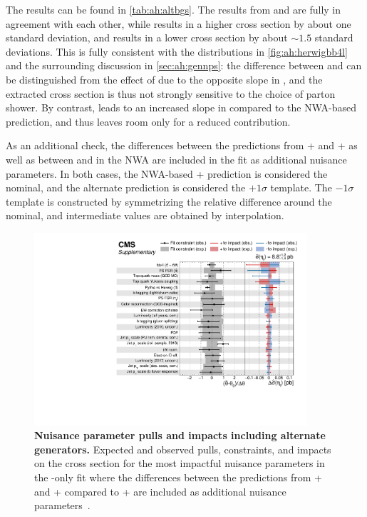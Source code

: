 The results can be found in \cref{tab:ah:altbgs}. The results from \pythia and \herwig are fully in agreement with each other, while \amcatnlo results in a higher \etat cross section by about one standard deviation, and \bbfourl results in a lower \etat cross section by about $\sim1.5$ standard deviations. 
This is fully consistent with the distributions in \cref{fig:ah:herwigbb4l} and the surrounding discussion in \cref{sec:ah:gennps}: the difference between \pythia and \herwig can be distinguished from the effect of \etat due to the opposite slope in \chel, and the extracted \etat cross section is thus not strongly sensitive to the choice of parton shower. By contrast, \bbfourl leads to an increased slope in \chel compared to the NWA-based \tttWsum prediction, and thus leaves room only for a reduced \etat contribution.

As an additional check, the differences between the predictions from \powheg + \herwig and \powheg + \pythia as well as between \bbfourl and \tttWsum in the NWA are included in the fit as additional nuisance parameters. In both cases, the NWA-based \powheg + \pythia prediction is considered the nominal, and the alternate prediction is considered the $+1\sigma$ template. The $-1\sigma$ template is constructed by symmetrizing the relative difference around the nominal, and intermediate values are obtained by interpolation.

\begin{figure}[!th]
    \centering
    \includegraphics[width=0.9\textwidth]{figures/ah/etatfit/impacts_gennps.pdf}
    \caption{
        \textbf{Nuisance parameter pulls and impacts including alternate generators.} Expected and observed pulls, constraints, and impacts on the \etat cross section for the most impactful nuisance parameters in the \etat-only fit where the differences between the predictions from \powheg \hvq + \herwig and \bbfourl + \pythia compared to \powheg \hvq + \pythia are included as additional nuisance parameters~\cite{CMS:TOP-24-007}.
    }
    \label{fig:ah:impacts_etat_gennps}
\end{figure}

